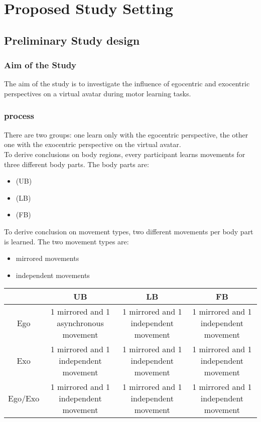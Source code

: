 \chapter{Proposed Study Setting}
\section{Preliminary Study design}

\subsection{Aim of the Study}
The aim of the study is to investigate the influence of egocentric and exocentric perspectives on a virtual avatar during motor learning tasks.

\subsection{process}
There are two groups: one learn only with the egocentric perspective, the other one with the exocentric perspective on the virtual avatar.\\
To derive conclusions on body regions, every participant learns movements for three different body parts. The body parts are:
\begin{itemize}
	\item \UB (UB)
	\item \LB (LB)
	\item \FB (FB)
\end{itemize}
To derive conclusion on movement types, two different movements per body part is learned. The two movement types are:
\begin{itemize}
	\item mirrored movements
	\item independent movements
\end{itemize}

\begin{center}
	\begin{tabular}{ | c | c | c | c | }
		\hline
		& UB & LB & FB \\ \hline 
		Ego & \parbox{4cm}{1 mirrored and 1 asynchronous movement} & \parbox{4cm}{1 mirrored and 1 independent movement} & \parbox{4cm}{1 mirrored and 1 independent movement} \\ \hline 
		Exo & \parbox{4cm}{1 mirrored and 1 independent movement} & \parbox{4cm}{1 mirrored and 1 independent movement} & \parbox{4cm}{1 mirrored and 1 independent movement} \\ \hline
		Ego/Exo & \parbox{4cm}{1 mirrored and 1 independent movement} & \parbox{4cm}{1 mirrored and 1 independent movement} & \parbox{4cm}{1 mirrored and 1 independent movement} \\
		\hline
	\end{tabular}
	\label{table:studyDesign}
\end{center}

